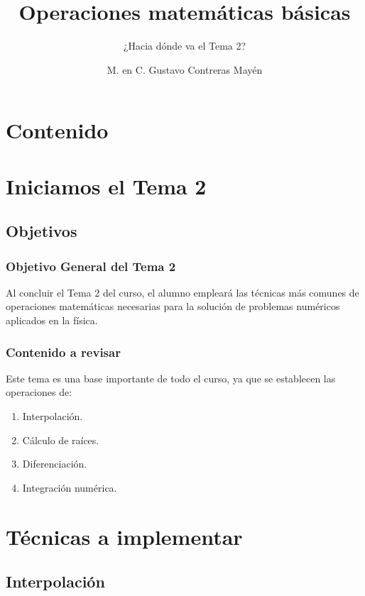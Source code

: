 \documentclass[12pt]{beamer}
\title{\large{Operaciones matemáticas básicas}}
\subtitle{¿Hacia dónde va el Tema 2?}
\author{M. en C. Gustavo Contreras Mayén}
\date{}
\begin{document}
\maketitle

\section*{Contenido}

\section{Iniciamos el Tema 2}
\subsection{Objetivos}

\begin{frame}
\frametitle{Objetivo General del Tema 2}
Al concluir el Tema 2 del curso, el alumno empleará las técnicas más comunes de operaciones matemáticas necesarias para la solución de problemas numéricos aplicados en la física.
\end{frame}
\begin{frame}
\frametitle{Contenido a revisar}
Este tema es una base importante de todo el curso, ya que se establecen las operaciones de:
\begin{enumerate}[<+->]
\item Interpolación.
\item Cálculo de raíces.
\item Diferenciación.
\item Integración numérica.
\end{enumerate}
\end{frame}

\section{Técnicas a implementar}
\subsection{Interpolación}
\end{document}
